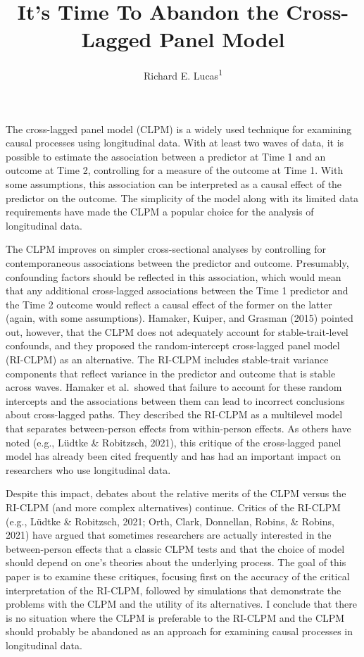 \documentclass[
  english,
  man,floatsintext]{apa6}
\title{It's Time To Abandon the Cross-Lagged Panel Model}
\author{Richard E. Lucas\textsuperscript{1}}
\date{}
\affiliation{\vspace{0.5cm}\textsuperscript{1} Department of Psychology, Michigan State University}
\begin{document}
\maketitle

The cross-lagged panel model (CLPM) is a widely used technique for examining causal processes using longitudinal data. With at least two waves of data, it is possible to estimate the association between a predictor at Time 1 and an outcome at Time 2, controlling for a measure of the outcome at Time 1. With some assumptions, this association can be interpreted as a causal effect of the predictor on the outcome. The simplicity of the model along with its limited data requirements have made the CLPM a popular choice for the analysis of longitudinal data.

The CLPM improves on simpler cross-sectional analyses by controlling for contemporaneous associations between the predictor and outcome. Presumably, confounding factors should be reflected in this association, which would mean that any additional cross-lagged associations between the Time 1 predictor and the Time 2 outcome would reflect a causal effect of the former on the latter (again, with some assumptions). Hamaker, Kuiper, and Grasman (2015) pointed out, however, that the CLPM does not adequately account for stable-trait-level confounds, and they proposed the random-intercept cross-lagged panel model (RI-CLPM) as an alternative. The RI-CLPM includes stable-trait variance components that reflect variance in the predictor and outcome that is stable across waves. Hamaker et al.~showed that failure to account for these random intercepts and the associations between them can lead to incorrect conclusions about cross-lagged paths. They described the RI-CLPM as a multilevel model that separates between-person effects from within-person effects. As others have noted (e.g., Lüdtke \& Robitzsch, 2021), this critique of the cross-lagged panel model has already been cited frequently and has had an important impact on researchers who use longitudinal data.

Despite this impact, debates about the relative merits of the CLPM versus the RI-CLPM (and more complex alternatives) continue. Critics of the RI-CLPM (e.g., Lüdtke \& Robitzsch, 2021; Orth, Clark, Donnellan, Robins, \& Robins, 2021) have argued that sometimes researchers are actually interested in the between-person effects that a classic CLPM tests and that the choice of model should depend on one's theories about the underlying process. The goal of this paper is to examine these critiques, focusing first on the accuracy of the critical interpretation of the RI-CLPM, followed by simulations that demonstrate the problems with the CLPM and the utility of its alternatives. I conclude that there is no situation where the CLPM is preferable to the RI-CLPM and the CLPM should probably be abandoned as an approach for examining causal processes in longitudinal data.
\end{document}
